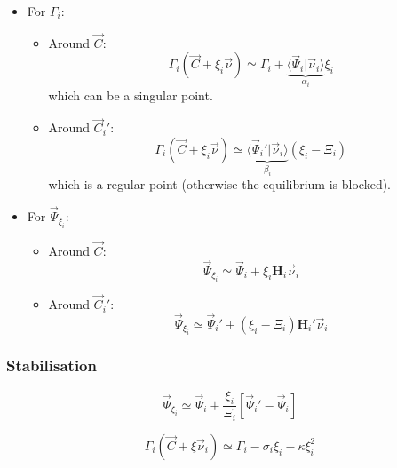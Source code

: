 \documentclass[aps,12pt]{revtex4}
\begin{document}
\begin{itemize} 
\item For $\Gamma_i$:%

\begin{itemize}
\item Around $\vec{C}$: 	
\begin{equation}
	\Gamma_i(\vec{C}+\xi_i\vec{\nu}) \simeq \Gamma_i + \underbrace{\langle \vec{\Psi}_i \vert \vec{\nu}_i\rangle}_{\alpha_i} \xi_i
\end{equation}
which can be a singular point.

\item Around $\vec{C}_i'$:
\begin{equation}
	\Gamma_i(\vec{C}+\xi_i\vec{\nu}) \simeq \underbrace{\langle \vec{\Psi}_i' \vert \vec{\nu}_i\rangle}_{\beta_i} (\xi_i-\Xi_i)
\end{equation}
which is a regular point (otherwise the equilibrium is blocked). 
\end{itemize}

\item For $\vec{\Psi}_{\xi_i}$: %

\begin{itemize}
\item Around $\vec{C}$: 	
	\begin{equation}
		\vec{\Psi}_{\xi_i} \simeq \vec{\Psi}_i + \xi_i \bm{H}_i \vec{\nu}_i
	\end{equation}

\item Around $\vec{C}_i'$:
		\begin{equation}
		\vec{\Psi}_{\xi_i} \simeq \vec{\Psi}_i' + (\xi_i-\Xi_i) \bm{H}_i' \vec{\nu}_i
	\end{equation}

\end{itemize}

\end{itemize}

\subsubsection{Stabilisation}

\begin{equation}
	\vec{\Psi}_{\xi_i} \simeq \vec{\Psi}_i + \dfrac{\xi_i}{\Xi_i}\left[ \vec{\Psi}_i' - \vec{\Psi}_i \right]
\end{equation}

\begin{equation}
	\Gamma_i(\vec{C} + \xi \vec{\nu}_i) \simeq \Gamma_i - \sigma_i \xi_i - \kappa \xi_i^2
\end{equation}
\end{document}
